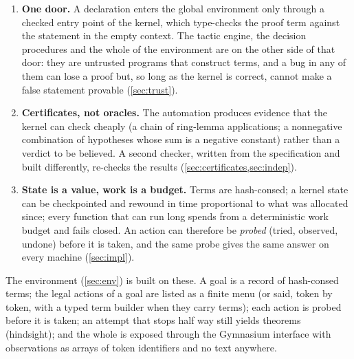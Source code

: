 \begin{enumerate}[label=\textbf{(\roman*)},leftmargin=3em]
\item \textbf{One door.}
  A declaration enters the global environment only through a checked entry point of the kernel, which type-checks the proof term against the statement in the empty context.
  The tactic engine, the decision procedures and the whole of the environment are on the other side of that door: they are untrusted programs that construct terms, and a bug in any of them can lose a proof but, so long as the kernel is correct, cannot make a false statement provable (\cref{sec:trust}).
\item \textbf{Certificates, not oracles.}
  The automation produces evidence that the kernel can check cheaply (a chain of ring-lemma applications; a nonnegative combination of hypotheses whose sum is a negative constant) rather than a verdict to be believed.
  A second checker, written from the specification and built differently, re-checks the results (\cref{sec:certificates,sec:indep}).
\item \textbf{State is a value, work is a budget.}
  Terms are hash-consed; a kernel state can be checkpointed and rewound in time proportional to what was allocated since; every function that can run long spends from a deterministic work budget and fails closed.
  An action can therefore be \emph{probed} (tried, observed, undone) before it is taken, and the same probe gives the same answer on every machine (\cref{sec:impl}).
\end{enumerate}

The environment (\cref{sec:env}) is built on these.
A goal is a record of hash-consed terms; the legal actions of a goal are listed as a finite menu (or said, token by token, with a typed term builder when they carry terms); each action is probed before it is taken; an attempt that stops half way still yields theorems (hindsight); and the whole is exposed through the Gymnasium interface \citep{towers24,brockman16} with observations as arrays of token identifiers and no text anywhere.

